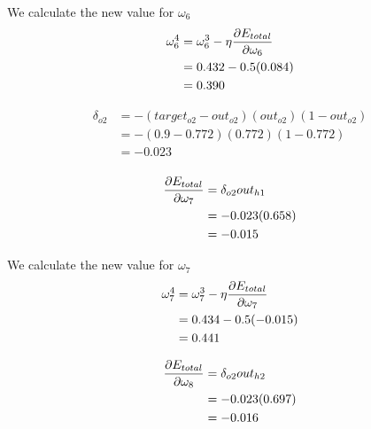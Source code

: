 \documentclass[10pt,a4paper]{article}
\begin{document}
We calculate the new value for $\omega_6$
\begin{equation}
\begin{split}
\omega_6^4 &= \omega_6^3 - \eta\pdv{E_{total}}{\omega_6}\\
           &= 0.432 -0.5(0.084)\\
           &= 0.390\\
\end{split}
\end{equation}

\begin{equation}
\begin{split}
\delta_{o2} &= -(target_{o2} -out_{o2})(out_{o2})(1-out_{o2})\\
            &= -(0.9-0.772)(0.772)(1-0.772)\\
            &= -0.023\\
\end{split}
\end{equation}

\begin{equation}
\begin{split}
\pdv{E_{total}}{\omega_7} &= \delta_{o2}out_{h1}\\
                          &= -0.023(0.658)\\
                          &= -0.015\\
\end{split}
\end{equation}

We calculate the new value for $\omega_7$
\begin{equation}
\begin{split}
\omega_7^4 &= \omega_7^3 - \eta\pdv{E_{total}}{\omega_7}\\
           &= 0.434 -0.5(-0.015)\\
           &= 0.441\\
\end{split}
\end{equation}

\begin{equation}
\begin{split}
\pdv{E_{total}}{\omega_8} &= \delta_{o2}out_{h2}\\
                          &= -0.023(0.697)\\
                          &= -0.016\\
\end{split}
\end{equation}
\end{document}
